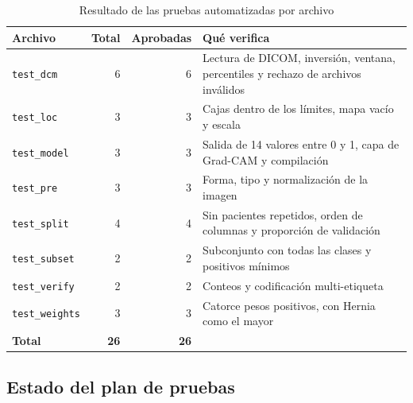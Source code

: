 \documentclass[11.5pt]{article}
\begin{document}
\begin{table}[H]
\centering
\small
\caption{Resultado de las pruebas automatizadas por archivo}
\label{tab:tests}
\begin{tabularx}{\textwidth}{L{3cm} r r X}
\toprule
Archivo & Total & Aprobadas & Qué verifica \\
\midrule
\texttt{test\_dcm} & 6 & 6 & Lectura de DICOM, inversión, ventana, percentiles y rechazo de archivos inválidos \\
\texttt{test\_loc} & 3 & 3 & Cajas dentro de los límites, mapa vacío y escala \\
\texttt{test\_model} & 3 & 3 & Salida de 14 valores entre 0 y 1, capa de Grad-CAM y compilación \\
\texttt{test\_pre} & 3 & 3 & Forma, tipo y normalización de la imagen \\
\texttt{test\_split} & 4 & 4 & Sin pacientes repetidos, orden de columnas y proporción de validación \\
\texttt{test\_subset} & 2 & 2 & Subconjunto con todas las clases y positivos mínimos \\
\texttt{test\_verify} & 2 & 2 & Conteos y codificación multi-etiqueta \\
\texttt{test\_weights} & 3 & 3 & Catorce pesos positivos, con Hernia como el mayor \\
\midrule
\textbf{Total} & \textbf{26} & \textbf{26} & \\
\bottomrule
\end{tabularx}
\end{table}

\subsection{Estado del plan de pruebas}
\end{document}
